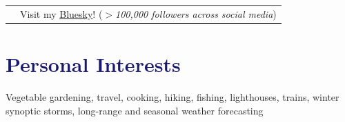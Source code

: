 \documentclass[margin,line,palatino,courier,10pt]{res}
\begin{document}
\begin{resume}
\begin{tabular}{@{}p{0.9in}p{4in}}
& Visit my \href{https://bsky.app/profile/zlabe.bsky.social}{Bluesky}! (\textit{$>$100,000 followers across social media})\\
\end{tabular}

\vspace{-0.1in}
\noindent\textcolor{MidnightBlue}{\makebox[\linewidth][r]{\rule{\textwidth}{5pt}}}
\vspace{-0.3in}
\section{\sc \textcolor{MidnightBlue}{\large{\textbf{Personal Interests}}}}
Vegetable gardening, travel, cooking, hiking, fishing, lighthouses, trains, winter synoptic storms, long-range and seasonal weather forecasting

\end{resume}
\end{document}
